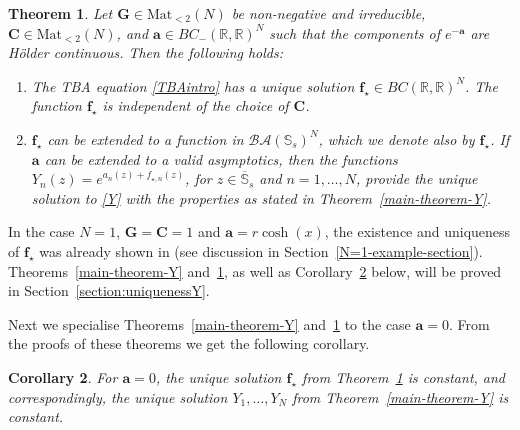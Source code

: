 \documentclass[12pt]{article}
\theoremstyle{plain}
\newtheorem{theorem}{Theorem}
\newtheorem{corollary}[theorem]{Corollary}
\theoremstyle{definition}
\numberwithin{equation}{section}
\numberwithin{theorem}{section}
\renewcommand{\vec}[1]{\mathbf{#1}}
\begin{document}
\begin{theorem}\label{main-theorem-TBA} Let  $\vec{G} \in \mathrm{Mat}_{<2}(N)$ be non-negative and irreducible, $\vec{C} \in \mathrm{Mat}_{<2}(N)$, and $\vec{a}\in BC_-(\mathbb{R},\mathbb{R})^N$ such that the components of $e^{-\vec{a}}$ are H\"older continuous. 
Then the following holds:
\begin{enumerate}[label=\roman*)]
\item\label{mainTBAunique} The TBA equation \eqref{TBAintro} has a unique solution $\vec{f}_\star \in BC(\mathbb{R},\mathbb{R})^N$. The function $\vec{f}_\star$ is independent of the choice of $\vec{C}$.
\item\label{mainTBAsolvesY} $\vec{f}_\star$ can be extended to a function in 
$\mathcal{BA}(\mathbb{S}_s)^N$,
which we denote also by $\vec{f}_\star$.
If $\vec{a}$ can be extended to a valid asymptotics, then the functions
	$Y_n(z) = e^{a_n(z)+f_{\star,n}(z)}$, 
for $z \in \overline{\mathbb{S}}_s$ and $n=1,\dots,N$, provide the unique solution to \eqref{Y} with the properties as stated in Theorem~\ref{main-theorem-Y}.
\end{enumerate}
\end{theorem}


In the case $N=1$, $\vec{G}=\vec{C}=1$ and $\vec{a} = r\cosh(x)$, 
the existence and uniqueness of $\vec{f}_\star$ was already shown in \cite{FringKorffSchulz} (see discussion in Section~\ref{N=1-example-section}).
Theorems~\ref{main-theorem-Y} and~\ref{main-theorem-TBA}, as well as Corollary~\ref{unique-constant-sol} below, will be proved in Section~\ref{section:uniquenessY}.

\medskip

Next we specialise Theorems~\ref{main-theorem-Y} and~\ref{main-theorem-TBA} to the case $\vec{a}=0$. From the proofs of these theorems we get the following corollary. 

\begin{corollary}\label{unique-constant-sol}
For $\vec{a}=0$, the unique solution $\vec{f}_\star$ from Theorem~\ref{main-theorem-TBA} is constant, and correspondingly, the unique solution $Y_1,\dots,Y_N$ from Theorem~\ref{main-theorem-Y} is constant.
\end{corollary}
\end{document}
